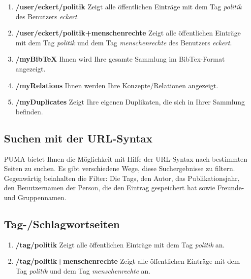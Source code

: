 \begin{enumerate}
    \item \textbf{/user/eckert/politik} \newline
    Zeigt alle öffentlichen Einträge mit dem Tag \textit{politik} des Benutzers \textit{eckert}.
    \item \textbf{/user/eckert/politik+menschenrechte} \newline
    Zeigt alle öffentlichen Einträge mit dem Tag \textit{politik} und dem Tag \textit{menschenrechte} des Benutzers \textit{eckert}.
     \item \textbf{/myBibTeX} \newline
    Ihnen wird Ihre gesamte Sammlung im BibTex-Format angezeigt.
    \item \textbf{/myRelations} \newline
    Ihnen werden Ihre Konzepte/Relationen angezeigt.
    \item \textbf{/myDuplicates} \newline
    Zeigt Ihre eigenen Duplikaten, die sich in Ihrer Sammlung befinden.
\end{enumerate}    
\subsection{Suchen mit der URL-Syntax}
\label{subsec:suchenMitUrlSyntax}
PUMA bietet Ihnen die Möglichkeit mit Hilfe der URL-Syntax nach bestimmten Seiten zu suchen. Es gibt verschiedene Wege, diese Suchergebnisse zu filtern. Gegenwärtig beinhalten die Filter: Die Tags, den Autor, das Publikationsjahr, den Benutzernamen der Person, die den Eintrag gespeichert hat sowie Freunde- und Gruppennamen. \newline
\newline
\subsection{Tag-/Schlagwortseiten}
\label{subsec:tagseiten}
\begin{enumerate}
    \item \textbf{/tag/politik} \newline
    Zeigt alle öffentlichen Einträge mit dem Tag \textit{politik} an.
    \item \textbf{/tag/politik+menschenrechte}\newline
    Zeigt alle öffentlichen Einträge mit dem Tag \textit{politik} und dem Tag \textit{menschenrechte} an.
\end{enumerate}
